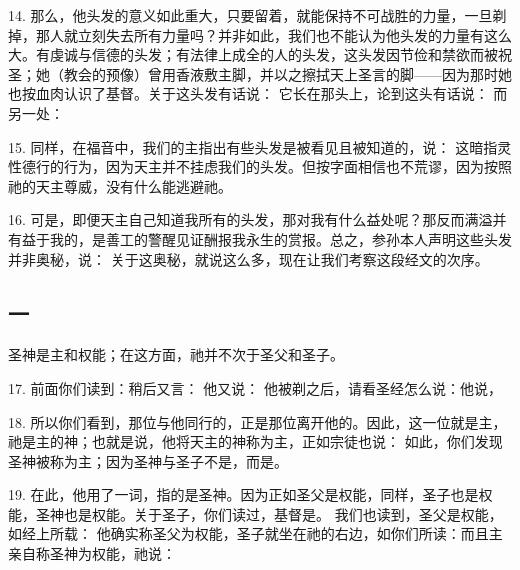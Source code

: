 14. 那么，他头发的意义如此重大，只要留着，就能保持不可战胜的力量，一旦剃掉，那人就立刻失去所有力量吗？并非如此，我们也不能认为他头发的力量有这么大。有虔诚与信德的头发；有法律上成全的人的头发，这头发因节俭和禁欲而被祝圣；她（教会的预像）曾用香液敷主脚，并以之擦拭天上圣言的脚——因为那时她也按血肉认识了基督。关于这头发有话说： 它长在那头上，论到这头有话说： 而另一处：\par

15. 同样，在福音中，我们的主指出有些头发是被看见且被知道的，说： 这暗指灵性德行的行为，因为天主并不挂虑我们的头发。但按字面相信也不荒谬，因为按照祂的天主尊威，没有什么能逃避祂。\par

16. 可是，即便天主自己知道我所有的头发，那对我有什么益处呢？那反而满溢并有益于我的，是善工的警醒见证酬报我永生的赏报。总之，参孙本人声明这些头发并非奥秘，说： 关于这奥秘，就说这么多，现在让我们考察这段经文的次序。\par


\subsection{一}

圣神是主和权能；在这方面，祂并不次于圣父和圣子。\par

17. 前面你们读到：稍后又言： 他又说： 他被剃之后，请看圣经怎么说：他说，\par

18. 所以你们看到，那位与他同行的，正是那位离开他的。因此，这一位就是主，祂是主的神；也就是说，他将天主的神称为主，正如宗徒也说： 如此，你们发现圣神被称为主；因为圣神与圣子不是，而是。\par

19. 在此，他用了一词，指的是圣神。因为正如圣父是权能，同样，圣子也是权能，圣神也是权能。关于圣子，你们读过，基督是。 我们也读到，圣父是权能，如经上所载： 他确实称圣父为权能，圣子就坐在祂的右边，如你们所读：而且主亲自称圣神为权能，祂说：\par

